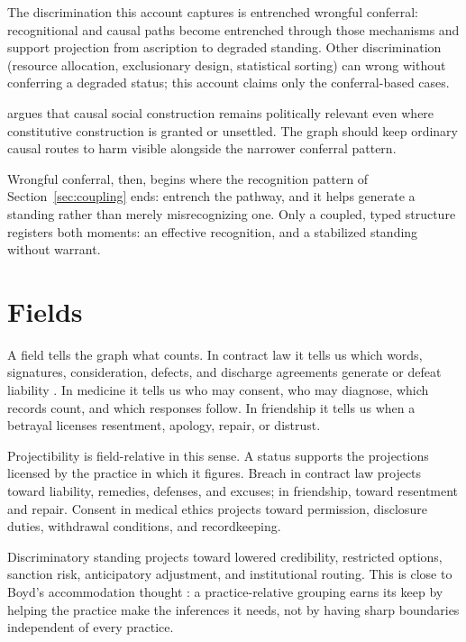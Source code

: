 \documentclass[12pt]{article}
\begin{document}
The discrimination this account captures is entrenched wrongful conferral: recognitional and causal paths become entrenched through those mechanisms and support projection from ascription to degraded standing. Other discrimination (resource allocation, exclusionary design, statistical sorting) can wrong without conferring a degraded status; this account claims only the conferral-based cases.

\textcite[pp.~19--23]{marques2017CausalSocialConstruction} argues that causal social construction remains politically relevant even where constitutive construction is granted or unsettled. The graph should keep ordinary causal routes to harm visible alongside the narrower conferral pattern.

Wrongful conferral, then, begins where the recognition pattern of Section~\ref{sec:coupling} ends: entrench the pathway, and it helps generate a standing rather than merely misrecognizing one. Only a coupled, typed structure registers both moments: an effective recognition, and a stabilized standing without warrant.

\section{Fields}
\label{sec:fields}

A field tells the graph what counts. In contract law it tells us which words, signatures, consideration, defects, and discharge agreements generate or defeat liability \citep[\S\S~281, 285]{americanLawInstitute1981RestatementContracts}. In medicine it tells us who may consent, who may diagnose, which records count, and which responses follow. In friendship it tells us when a betrayal licenses resentment, apology, repair, or distrust.

Projectibility is field-relative in this sense. A status supports the projections licensed by the practice in which it figures. Breach in contract law projects toward liability, remedies, defenses, and excuses; in friendship, toward resentment and repair. Consent in medical ethics projects toward permission, disclosure duties, withdrawal conditions, and recordkeeping.

Discriminatory standing projects toward lowered credibility, restricted options, sanction risk, anticipatory adjustment, and institutional routing. This is close to Boyd's accommodation thought \citep{boyd1999}: a practice-relative grouping earns its keep by helping the practice make the inferences it needs, not by having sharp boundaries independent of every practice.
\end{document}
